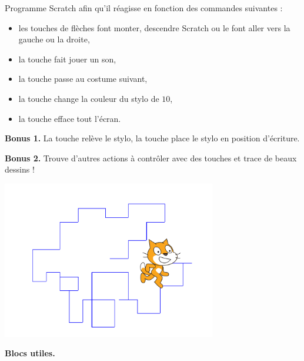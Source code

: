 \documentclass[class=report,crop=false, 12pt]{standalone}
\begin{document}




\bigskip
\bigskip


\begin{activite}
Programme Scratch afin qu'il réagisse en fonction des commandes suivantes :
\begin{itemize}
  \item les touches de flèches font monter, descendre Scratch ou le font aller vers la gauche ou la droite,
  \item la touche  fait jouer un son,
  \item la touche  passe au costume suivant,
  \item la touche  change la couleur du stylo de $10$,
  \item la touche  efface tout l'écran.
\end{itemize}

\medskip

\textbf{Bonus 1.} La touche  relève le stylo, la touche  place le stylo en position d'écriture.

\textbf{Bonus 2.} Trouve d'autres actions à contrôler avec des touches et trace de beaux dessins !

\begin{center}
  \includegraphics[width=0.7\textwidth]{ecran-05-ex1} 
\end{center}

\medskip

\textbf{Blocs utiles.}
\begin{center}
\begin{scratch}
  { 
    \blockspace
  }
\end{scratch}
\end{center}

\end{activite}
\end{document}

